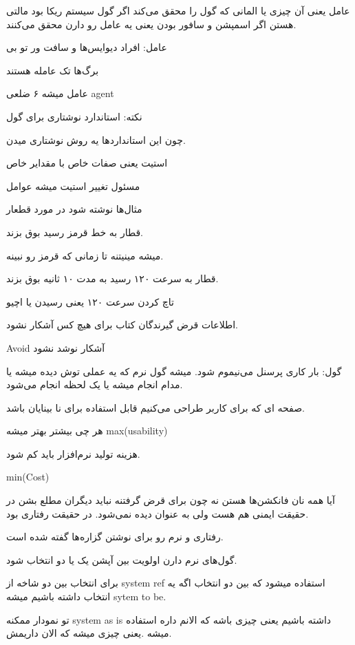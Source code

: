 عامل یعنی آن چیزی یا المانی که گول را محقق می‌کند
اگر گول سیستم ریکا بود مالتی هستن
اگر اسمپشن و سافور بودن یعنی یه عامل رو دارن محقق می‌کنند.

عامل: افراد دیوایس‌ها و سافت ور تو بی

برگ‌ها تک عامله هستند 

عامل میشه ۶ ضلعی agent

نکته: استاندارد نوشتاری برای گول

چون این استاندارد‌ها یه روش نوشتاری میدن.

استیت یعنی صفات خاص با مقدایر خاص

مسئول تغییر استیت میشه عوامل

مثال‌ها نوشته شود در مورد قطعار

قطار به خط قرمز رسید بوق بزند.

میشه مینیتنه تا زمانی که قرمز رو نبینه.

قطار به سرعت ۱۲۰ رسید به مدت ۱۰ ثانیه بوق بزند.

تاچ کردن سرعت ۱۲۰ یعنی رسیدن یا اچیو

اطلاعات قرض گیرندگان کتاب برای هیچ کس آشکار نشود.

Avoid آشکار نوشد نشود

گول: بار کاری پرسنل می‌نیموم شود. 
میشه گول نرم
که یه عملی توش دیده میشه
یا مدام انجام میشه
یا یک لحظه انجام می‌شود.

صفحه ای که برای کاربر طراحی می‌کنیم قابل استفاده برای نا بینایان باشد.

هر چی بیشتر بهتر میشه max(usability)

هزینه تولید نرم‌افزار باید کم شود.

min(Cost)

آیا همه نان فانکشن‌ها هستن نه
چون برای قرض گرفتنه نباید دیگران مطلع بشن در حقیقت ایمنی هم هست ولی به عنوان
 دیده نمی‌شود. در حقیقت رفتاری بود.

رفتاری و نرم رو برای نوشتن گزاره‌ها گفته شده است.

گول‌های نرم دارن اولویت بین آپشن یک یا دو انتخاب شود.

برای انتخاب بین دو شاخه از system ref استفاده میشود که بین دو انتخاب اگه یه
انتخاب داشته باشیم میشه sytem to be.

تو نمودار ممکنه system as is داشته باشیم یعنی چیزی باشه که الانم داره استفاده
میشه .یعنی چیزی میشه که الان داریمش.


